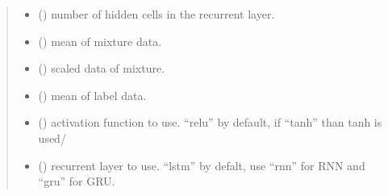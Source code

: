 \documentclass[letterpaper,10pt,english]{sphinxmanual}
\begin{document}
\begin{fulllineitems}
\begin{quote}
\begin{description}
\begin{itemize}
\item {} 
 () \textendash{} number of hidden cells in the recurrent layer.

\item {} 
 (\sphinxstyleliteralemphasis{\sphinxupquote{, }}\sphinxstyleliteralemphasis{\sphinxupquote{(}}\sphinxstyleliteralemphasis{\sphinxupquote{)}}) \textendash{} mean of mixture data.

\item {} 
 (\sphinxstyleliteralemphasis{\sphinxupquote{, }}\sphinxstyleliteralemphasis{\sphinxupquote{(}}\sphinxstyleliteralemphasis{\sphinxupquote{)}}) \textendash{} scaled data of mixture.

\item {} 
 (\sphinxstyleliteralemphasis{\sphinxupquote{, }}\sphinxstyleliteralemphasis{\sphinxupquote{(}}\sphinxstyleliteralemphasis{\sphinxupquote{)}}) \textendash{} mean of label data.

\item {} 
 () \textendash{} activation function to use. “relu” by default, if “tanh” than tanh is used/

\item {} 
 () \textendash{} recurrent layer to use. “lstm” by defalt, use “rnn” for RNN and “gru” for GRU.

\end{itemize}

\end{description}\end{quote}


\end{fulllineitems}
\end{document}
